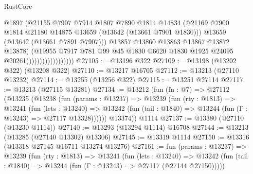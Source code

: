 \begin{lexlean}{RustCore}
\begin{coremodule}
                                        @1897
                                        (@21155
                                          @7907
                                          @7914
                                          @1807
                                          @7890
                                          @1814
                                          @14834
                                          (@21169
                                            @7900
                                            @1814
                                            @21180
                                            @14875
                                            @13659
                                            (@13642 (@13661 @7901 @1830)))
                                          @13659
                                          (@13642 (@13661 @7891 @7907)))
                                        @13857
                                        @13860
                                        @13863
                                        @13867
                                        @13872
                                        @13878)
                                      (@19955
                                        @7917
                                        @781
                                        @99
                                        @45
                                        @1830
                                        @6620
                                        @1830
                                        @1925
                                        @24095
                                        @20261))))))))))))))))))
@27105 := @13196 @322
@27109 := @13198 (@13202 @322) (@13208 @322)
@27110 := @13217 @16705
@27112 := @13213 (@27110 @13232)
@27114 := @13255 (@13256 @322)
@27115 := @13251 @27114
@27117 := @13213 (@27115 @13281)
@27134 := @13212
    (fun (fn : @7) =>
    @27112
      (@13235
        (@13238
          (fun (params : @13237) =>
          @13239
            (fun (rty : @1813) =>
            @13241
              (fun (lets : @13240) =>
              @13242 (fun (tail : @1840) => @13244 (fun (Γ : @13243) => @27117 @13328))))))
        @13374))
    @1114
@27137 := @13380 (@27110 (@13230 @1114))
@27140 := @13293 (@13294 @1114) @16708
@27144 := @13213 (@13285 (@27140 @13302) @13306)
@27145 := @13319 @1114
@27150 := @13316 (@13318 @27145 @16711 @13274 @13276)
@27161 := fun (params : @13237) =>
  @13239
    (fun (rty : @1813) =>
    @13241
      (fun (lets : @13240) =>
      @13242 (fun (tail : @1840) => @13244 (fun (Γ : @13243) => @27117 (@27144 @27150)))))

\end{coremodule}
\end{lexlean}

